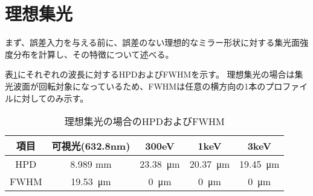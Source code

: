\clearpage
\newpage

\section{理想集光}
\label{chap2_ideal_focusing}

まず、誤差入力を与える前に、誤差のない理想的なミラー形状に対する集光面強度分布を計算し、その特徴について述べる。

\begin{comment}
\begin{figure}[!ht]
\centering

\subfloat[可視光(632.8nm)]{
    \texttt{[image: ideal/visible\_light\_focus\_abs.png]}
    \label{fig:visible_light_ideal_focus_abs}
}
\subfloat[300eV]{
    \centering
    \texttt{[image: ideal/300eV\_focus\_abs.png]}
    \label{fig:300eV_ideal_focus_abs}
}
\subfloat[1keV]{
    \centering
    \texttt{[image: ideal/1keV\_focus\_abs.png]}
    \label{fig:1keV_ideal_focus_abs}
}
\subfloat[3keV]{
    \centering
    \texttt{[image: ideal/3keV\_focus\_abs.png]}
    \label{fig:3keV_ideal_focus_abs}
}
\caption[]{理想的なミラーの各波長に対する集光波面}
\label{fig:fwhm_explanation}
\end{figure}
\end{comment}

表\ref{tb:ideal_focus_evaluation}にそれぞれの波長に対するHPDおよびFWHMを示す。
理想集光の場合は集光波面が回転対象になっているため、FWHMは任意の横方向の1本のプロファイルに対してのみ示す。

\begin{table}[!ht]
\begin{center}
  \begin{tabular}{|c|c|c|c|c|} \hline
    項目 & 可視光(632.8nm) & 300eV & 1keV & 3keV \\ \hline
    HPD & 8.989 mm & \SI{23.38}{\micro \metre} & \SI{20.37}{\micro \metre} & \SI{19.45}{\micro \metre} \\
    FWHM & \SI{19.53}{\micro \metre} & \SI{0}{\micro \metre} & \SI{0}{\micro \metre} & \SI{0}{\micro \metre} \\ \hline
  \end{tabular}
  \caption{理想集光の場合のHPDおよびFWHM}
  \label{tb:ideal_focus_evaluation}
\end{center}
\end{table}

